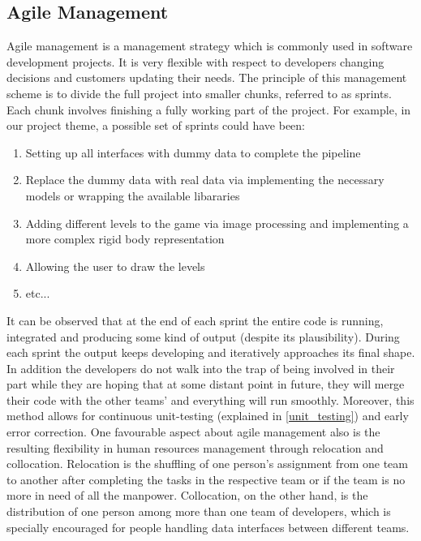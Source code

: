 \subsection{Agile Management}
Agile management is a management strategy which is commonly used in software development projects. It is very flexible with respect to developers changing decisions and customers updating their needs. The principle of this management scheme is to divide the full project into smaller chunks, referred to as sprints. Each chunk involves finishing a fully working part of the project. For example, in our project theme, a possible set of sprints could have been:
\begin{enumerate}
  \item{Setting up all interfaces with dummy data to complete the pipeline}
  \item{Replace the dummy data with real data via implementing the necessary models or wrapping the available libararies}
  \item{Adding different levels to the game via image processing and implementing a more complex rigid body representation}
  \item{Allowing the user to draw the levels}
  \item{etc...}
\end{enumerate}
It can be observed that at the end of each sprint the entire code is running, integrated and producing some kind of output (despite its 	plausibility). During each sprint the output keeps developing and iteratively approaches its final shape. In addition the developers do not walk into the trap of being involved in their part while they are hoping that at some distant point in future, they will merge their code with the other teams' and everything will run smoothly. Moreover, this method allows for continuous unit-testing (explained in \autoref{unit_testing}) and early error correction.
One favourable aspect about agile management also is the resulting flexibility in human resources management through relocation and collocation. Relocation is the shuffling of one person's assignment from one team to another after completing the tasks in the respective team or if the team is no more in need of all the manpower. Collocation, on the other hand, is the distribution of one person among more than one team of developers, which is specially encouraged for people handling data interfaces between different teams.

